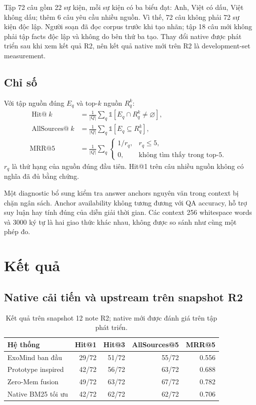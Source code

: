 \documentclass[11pt,a4paper]{article}
\begin{document}
Tập 72 câu gồm 22 sự kiện, mỗi sự kiện có ba biểu đạt: Anh, Việt có dấu, Việt không dấu; thêm 6 câu yêu cầu nhiều nguồn. Vì thế, 72 câu không phải 72 sự kiện độc lập. Người soạn đã đọc corpus trước khi tạo nhãn; tập 18 câu mới không phải tập facts độc lập và không do bên thứ ba tạo. Thay đổi native được phát triển sau khi xem kết quả R2, nên kết quả native mới trên R2 là development-set measurement.

\subsection{Chỉ số}
Với tập nguồn đúng $E_q$ và top-$k$ nguồn $R_q^k$:
\begin{align}
\operatorname{Hit@}k&=\frac{1}{|Q|}\sum_q\mathbb{1}[E_q\cap R_q^k\ne\varnothing],\\
\operatorname{AllSources@}k&=\frac{1}{|Q|}\sum_q\mathbb{1}[E_q\subseteq R_q^k],\\
\operatorname{MRR@5}&=\frac{1}{|Q|}\sum_q\begin{cases}1/r_q,&r_q\le5,\\0,&\text{không tìm thấy trong top-5.}\end{cases}
\end{align}
$r_q$ là thứ hạng của nguồn đúng đầu tiên. Hit@1 trên câu nhiều nguồn không có nghĩa đã đủ bằng chứng.

Một diagnostic bổ sung kiểm tra answer anchors nguyên văn trong context bị chặn ngân sách. Anchor availability không tương đương với QA accuracy, hỗ trợ suy luận hay tính đúng của diễn giải thời gian. Các context 256 whitespace words và 3000 ký tự là hai giao thức khác nhau, không được so sánh như cùng một phép đo.

\section{Kết quả}
\subsection{Native cải tiến và upstream trên snapshot R2}
\begin{table}[ht]
\centering\small
\begin{tabular}{@{}lrrrr@{}}
\toprule
Hệ thống & Hit@1 & Hit@3 & AllSources@5 & MRR@5 \\
\midrule
ExoMind ban đầu & 29/72 & 51/72 & 55/72 & 0.556 \\
Prototype inspired & 42/72 & 56/72 & 63/72 & 0.688 \\
Zero-Mem fusion & 49/72 & 63/72 & 67/72 & 0.782 \\
Native BM25 tối ưu & 42/72 & 62/72 & 62/72 & 0.706 \\
\bottomrule
\end{tabular}
\caption{Kết quả trên snapshot 12 note R2; native mới được đánh giá trên tập phát triển.}
\end{table}
\end{document}
